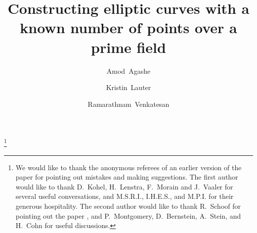 \documentclass{amsart}
\theoremstyle{plain}
\begin{document}


\title[Constructing elliptic curves]{Constructing elliptic curves with a known number 
of points over a prime field}

\author{Amod~Agashe}
\address{Department of Mathematics, University of Texas, Austin, Texas, USA}

\author{Kristin~Lauter}
\address{Microsoft Research,
         One Microsoft Way,
         Redmond, WA 98052, USA.}

\author{Ramarathnam~Venkatesan}
\address{Microsoft Research,
         One Microsoft Way,
         Redmond, WA 98052, USA.}

\thanks{We would like to thank the anonymous
referees of an earlier version of the paper for pointing out mistakes
and making suggestions. The first author would like to thank
D.~Kohel, H.~Lenstra, F.~Morain and J.~Vaaler for several 
useful conversations, and M.S.R.I., I.H.E.S., and M.P.I. for
their generous hospitality.  The second author would like to thank
R.~Schoof for pointing out the paper \cite{cnst}, and P.~Montgomery, D.~Bernstein,
A.~Stein, and H.~Cohn for useful discussions. 
}

\date{}


\renewcommand{\subjclassname}{\textup{2000} Mathematics Subject Classification}

\end{document}
